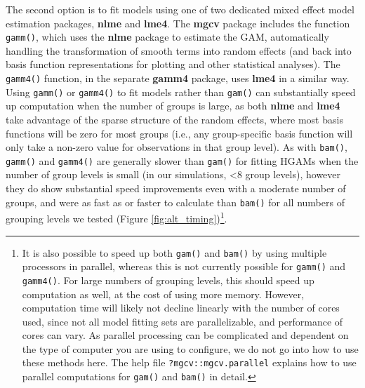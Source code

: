 \documentclass[12pt]{article}
\let\rmarkdownfootnote\footnote%
\def\footnote{\protect\rmarkdownfootnote}
\begin{document}
The second option is to fit models using one of two dedicated mixed
effect model estimation packages, \textbf{nlme} and \textbf{lme4}. The
\textbf{mgcv} package includes the function \texttt{gamm()}, which uses
the \textbf{nlme} package to estimate the GAM, automatically handling
the transformation of smooth terms into random effects (and back into
basis function representations for plotting and other statistical
analyses). The \texttt{gamm4()} function, in the separate \textbf{gamm4}
package, uses \textbf{lme4} in a similar way. Using \texttt{gamm()} or
\texttt{gamm4()} to fit models rather than \texttt{gam()} can
substantially speed up computation when the number of groups is large,
as both \textbf{nlme} and \textbf{lme4} take advantage of the sparse
structure of the random effects, where most basis functions will be zero
for most groups (i.e., any group-specific basis function will only take
a non-zero value for observations in that group level). As with
\texttt{bam()}, \texttt{gamm()} and \texttt{gamm4()} are generally
slower than \texttt{gam()} for fitting HGAMs when the number of group
levels is small (in our simulations, \textless{}8 group levels), however
they do show substantial speed improvements even with a moderate number
of groups, and were as fast as or faster to calculate than
\texttt{bam()} for all numbers of grouping levels we tested (Figure
\ref{fig:alt_timing})\footnote{It is also possible to speed up both
  \texttt{gam()} and \texttt{bam()} by using multiple processors in
  parallel, whereas this is not currently possible for \texttt{gamm()}
  and \texttt{gamm4()}. For large numbers of grouping levels, this
  should speed up computation as well, at the cost of using more memory.
  However, computation time will likely not decline linearly with the
  number of cores used, since not all model fitting sets are
  parallelizable, and performance of cores can vary. As parallel
  processing can be complicated and dependent on the type of computer
  you are using to configure, we do not go into how to use these methods
  here. The help file \texttt{?mgcv::mgcv.parallel} explains how to use
  parallel computations for \texttt{gam()} and \texttt{bam()} in detail.}.
\end{document}
